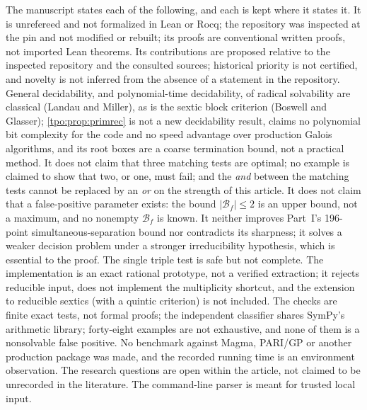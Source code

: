 \documentclass[11pt,letterpaper]{article}
\numberwithin{equation}{section}
\theoremstyle{definition}
\theoremstyle{remark}
\begin{document}
The manuscript states each of the following, and each is kept where it
states it. It is unrefereed and not formalized in Lean or Rocq; the
repository was inspected at the pin and not modified or rebuilt; its proofs
are conventional written proofs, not imported Lean theorems. Its
contributions are proposed relative to the inspected repository and the
consulted sources; historical priority is not certified, and novelty is not
inferred from the absence of a statement in the repository. General
decidability, and polynomial-time decidability, of radical solvability are
classical (Landau and Miller), as is the sextic block criterion (Boswell and
Glasser); \cref{tpo:prop:primrec} is not a new decidability result, claims no
polynomial bit complexity for the code and no speed advantage over
production Galois algorithms, and its root boxes are a coarse termination
bound, not a practical method. It does not claim that three matching tests
are optimal; no example is claimed to show that two, or one, must fail; and
the \emph{and} between the matching tests cannot be replaced by an
\emph{or} on the strength of this article. It does not claim that a
false-positive parameter exists: the bound $|\mathcal B_f|\le2$ is an upper
bound, not a maximum, and no nonempty $\mathcal B_f$ is known. It neither
improves Part~I's 196-point simultaneous-separation bound nor contradicts
its sharpness; it solves a weaker decision problem under a stronger
irreducibility hypothesis, which is essential to the proof. The single
triple test is safe but not complete. The implementation is an exact
rational prototype, not a verified extraction; it rejects reducible input,
does not implement the multiplicity shortcut, and the extension to
reducible sextics (with a quintic criterion) is not included. The checks
are finite exact tests, not formal proofs; the independent classifier
shares SymPy's arithmetic library; forty-eight examples are not exhaustive,
and none of them is a nonsolvable false positive. No benchmark against
Magma, PARI/GP or another production package was made, and the recorded
running time is an environment observation. The research questions are open
within the article, not claimed to be unrecorded in the literature. The
command-line parser is meant for trusted local input.
\end{document}
